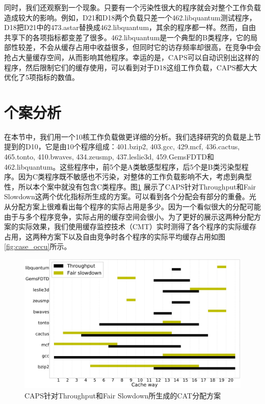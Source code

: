 同时，我们还观察到一个现象。只要有一个污染性很大的程序就会对整个工作负载造成较大的影响。例如，D21和D18两个负载只差一个462.libquantum测试程序，D18把D21中的473.astar替换成462.libquantum，其余的程序都一样。然而，自由共享下的各项指标都变差了很多。462.libquantum是一个典型的B类程序，它的局部性较差，不会从缓存占用中收益很多，但同时它的访存频率却很高，在竞争中会抢占大量缓存空间，从而影响其他程序。幸运的是，CAPS可以自动识别出这样的程序，然后限制它们的缓存使用，可以看到对于D18这组工作负载，CAPS都大大优化了5项指标的数值。

\section{个案分析}

在本节中，我们用一个10核工作负载做更详细的分析。我们选择研究的负载是上节提到的D10，它是由10个程序组成：401.bzip2, 403.gcc, 429.mcf, 436.cactus, 465.tonto, 410.bwaves, 434.zeusmp, 437.leslie3d, 459.GemsFDTD和462.libquantum。这些程序中，前5个是A类敏感型程序，后5个是B类污染型程序。因为C类程序既不敏感也不污染，对整体的工作负载影响不大，考虑到典型性，所以本个案中就没有包含C类程序。图\ref{fig:case_scheme} 展示了CAPS针对Throughput和Fair Slowdown这两个优化指标所生成的方案。可以看到各个分配会有部分的重叠。光从分配方案上很难看出每个程序的实际占用是多少。因为一个看似很大的分配可能由于与多个程序竞争，实际占用的缓存空间会很小。为了更好的展示这两种分配方案的实际效果，我们使用缓存监控技术（CMT）实时测得了各个程序的实际缓存占用，这两种方案下以及自由竞争时各个程序的实际平均缓存占用如图\ref{fig:case_occu}所示。

\begin{figure}[htbp]
\centering
\includegraphics[width=0.95\columnwidth]{figures/case_study.pdf}
\caption{CAPS针对Throughput和Fair Slowdown所生成的CAT分配方案}
\label{fig:case_scheme}
\end{figure} 

